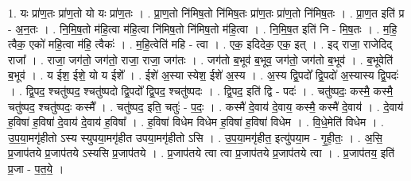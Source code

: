 \documentclass[17pt]{extarticle}
\begin{document}
1. यः प्रा॑ण॒तः प्रा॑ण॒तो यो यः प्रा॑ण॒तः । . प्रा॒ण॒तो नि॑मिष॒तो नि॑मिष॒तः प्रा॑ण॒तः प्रा॑ण॒तो नि॑मिष॒तः । . प्रा॒ण॒त इति॑ प्र - अ॒न॒तः । . नि॒मि॒ष॒तो म॑हि॒त्वा म॑हि॒त्वा नि॑मिष॒तो नि॑मिष॒तो म॑हि॒त्वा । . नि॒मि॒ष॒त इति॑ नि - मि॒ष॒तः । . म॒हि॒ त्वैक॒ एको॑ महि॒त्वा म॑हि॒ त्वैकः॑ । . म॒हि॒त्वेति॑ महि - त्वा । . एक॒ इदिदेक॒ एक॒ इत् । . इद् राजा॒ राजेदिद् राजा᳚ । . राजा॒ जग॑तो॒ जग॑तो॒ राजा॒ राजा॒ जग॑तः । . जग॑तो ब॒भूव॑ ब॒भूव॒ जग॑तो॒ जग॑तो ब॒भूव॑ । . ब॒भूवेति॑ ब॒भूव॑ । . य ईश॒ ईशे॒ यो य ईशे᳚ । . ईशे॑ अ॒स्या स्येश॒ ईशे॑ अ॒स्य । . अ॒स्य द्वि॒पदो᳚ द्वि॒पदो॑ अ॒स्यास्य द्वि॒पदः॑ । . द्वि॒पद॒ श्चतु॑ष्पद॒ श्चतु॑ष्पदो द्वि॒पदो᳚ द्वि॒पद॒ श्चतु॑ष्पदः । . द्वि॒पद॒ इति॑ द्वि - पदः॑ । . चतु॑ष्पदः॒ कस्मै॒ कस्मै॒ चतु॑ष्पद॒ श्चतु॑ष्पदः॒ कस्मै᳚ । . चतु॑ष्पद॒ इति॒ चतुः॑ - प॒दः॒ । . कस्मै॑ दे॒वाय॑ दे॒वाय॒ कस्मै॒ कस्मै॑ दे॒वाय॑ । . दे॒वाय॑ ह॒विषा॑ ह॒विषा॑ दे॒वाय॑ दे॒वाय॑ ह॒विषा᳚ । . ह॒विषा॑ विधेम विधेम ह॒विषा॑ ह॒विषा॑ विधेम । . वि॒धे॒मेति॑ विधेम । . उ॒प॒या॒मगृ॑हीतो ऽस्य स्युपया॒मगृ॑हीत उपया॒मगृ॑हीतो ऽसि । . उ॒प॒या॒मगृ॑हीत॒ इत्यु॑पया॒म - गृ॒ही॒तः॒ । . अ॒सि॒ प्र॒जाप॑तये प्र॒जाप॑तये ऽस्यसि प्र॒जाप॑तये । . प्र॒जाप॑तये त्वा त्वा प्र॒जाप॑तये प्र॒जाप॑तये त्वा । . प्र॒जाप॑तय॒ इति॑ प्र॒जा - प॒त॒ये॒ । \newline
\end{document}
